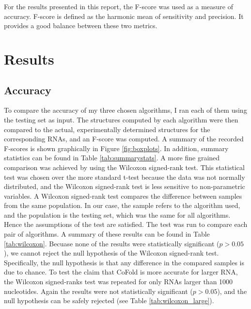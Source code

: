\documentclass[12pt, a4paper]{article}
\begin{document}
For the results presented in this report, the F-score was used as a measure of accuracy. F-score is defined as the harmonic mean of sensitivity and precision. It provides a good balance between these two metrics.

\section{Results}
\label{sec:results}
\subsection{Accuracy}
To compare the accuracy of my three chosen algorithms, I ran each of them using the testing set as input. The structures computed by each algorithm were then compared to the actual, experimentally determined structures for the corresponding RNAs, and an F-score was computed. A summary of the recorded F-scores is shown graphically in Figure \ref{fig:boxplots}. In addition, summary statistics can be found in Table \ref{tab:summarystats}. A more fine grained comparison was achieved by using the Wilcoxon signed-rank test. This statistical test was chosen over the more standard t-test because the data was not normally distributed, and the Wilcoxon signed-rank test is less sensitive to non-parametric variables. A Wilcoxon signed-rank test compares the difference between samples from the same population. In our case, the sample refers to the algorithm used, and the population is the testing set, which was the same for all algorithms. Hence the assumptions of the test are satisfied. The test was run to compare each pair of algorithms. A summary of these results can be found in Table \ref{tab:wilcoxon}. Becuase none of the results were statistically significant ($p > 0.05$), we cannot reject the null hypothesis of the Wilcoxon signed-rank test. Specifically, the null hypothesis is that any difference in the compared samples is due to chance. To test the claim that CoFold is more accurate for larger RNA, the Wilcoxon signed-ranks test was repeated for only RNAs larger than 1000 nucleotides. Again the results were not statistically significant ($p > 0.05$), and the null hypothesis can be safely rejected (see Table \ref{tab:wilcoxon_large}).
\end{document}
